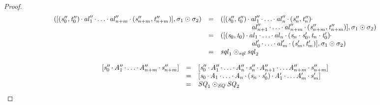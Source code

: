 \documentclass[acmsmall]{acmart}
\begin{document}
\begin{proof}
  \[
    \begin{array}{rcl}
      (\SequenceLensOf{(\String_0'',\StringAlt_0'') \SeqLSep \AtomLens_1'' \SeqLSep
      \ldots \SeqLSep
      \AtomLens_{n+m}'' \SeqLSep (\String_{n+m}'',\StringAlt_{n+m}'')},
      \ConcatPermutationOf{\sigma_1}{\sigma_2})
      & = & (\SequenceLensOf{(\String_0'',\StringAlt_0'') \SeqLSep \AtomLens_1'' \SeqLSep
            \ldots \SeqLSep \AtomLens_n'' \SeqLSep (\String_n'',\StringAlt_n'') \SeqLSep\\
      & & \hspace*{4.5em}\AtomLens_{n+1}'' \SeqLSep
          \ldots \SeqLSep \AtomLens_{n+m}'' \SeqLSep (\String_{n+m}'',\StringAlt_{n+m}'')},
          \ConcatPermutationOf{\sigma_1}{\sigma_2})\\
      & = & (\SequenceLensOf{(\String_0,\StringAlt_0) \SeqLSep \AtomLens_1 \SeqLSep
            \ldots \SeqLSep \AtomLens_n \SeqLSep
            (\String_n\Concat\String_0',\StringAlt_n\Concat\StringAlt_0')
            \SeqLSep \\
      & & \hspace*{4.5em}\AtomLens_0' \SeqLSep
          \ldots \SeqLSep \AtomLens_m' \SeqLSep (\String_m',\StringAlt_m')},
          \ConcatPermutationOf{\sigma_1}{\sigma_2})\\
      & = & \ConcatSequenceLensOf{\SequenceLens_1}{\SequenceLens_2}
    \end{array}
  \]


  \[
    \begin{array}{rcl}
      \SequenceOf{\String_0'' \SeqSep \Atom_1'' \SeqSep \ldots \SeqSep \Atom_{n+m}'' \SeqSep \String_{n+m}''}
      & = & \SequenceOf{\String_0'' \SeqSep \Atom_1'' \SeqSep \ldots \SeqSep \Atom_n'' \SeqSep \String_n'' \SeqSep \Atom_{n+1}'' \SeqSep 
            \ldots\Atom_{n+m}'' \SeqSep \String_{n+m}''}\\
      & = & \SequenceOf{\String_0 \SeqSep \Atom_1 \SeqSep \ldots \SeqSep \Atom_n \SeqSep (\String_n\Concat\String_0') \SeqSep \Atom_1' \SeqSep 
            \ldots\Atom_m' \SeqSep \String_m'}\\
      & = & \ConcatSequenceOf{\Sequence_1}{\Sequence_2}
    \end{array}
  \]



\end{proof}
\end{document}
